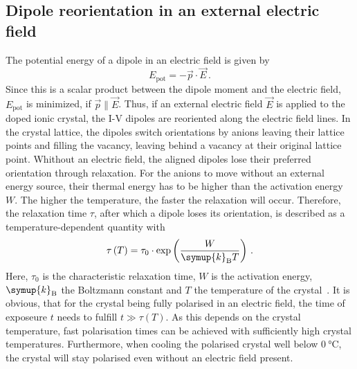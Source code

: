 \subsection{Dipole reorientation in an external electric field}
%
The potential energy of a dipole in an electric field is given by
\begin{equation*}
    E_{\mathrm{pot}} = -\vec{p}\cdot\vec{E}\,.
\end{equation*}
Since this is a scalar product between the dipole moment and the electric field, $E_{\mathrm{pot}}$ is minimized, if $\vec{p} \parallel \vec{E}$.
Thus, if an external electric field $\vec{E}$ is applied to the doped ionic crystal, the I-V dipoles are reoriented along the electric field lines.
In the crystal lattice, the dipoles switch orientations by anions leaving their lattice points and filling the vacancy, leaving behind a vacancy at their original lattice point.
\newline\noindent
Whithout an electric field, the aligned dipoles lose their preferred orientation through relaxation.
For the anions to move without an external energy source, their thermal energy has to be higher than the activation energy $W$.
The higher the temperature, the faster the relaxation will occur.
Therefore, the relaxation time $\tau$, after which a dipole loses its orientation, is described as a temperature-dependent quantity with
\begin{equation}
    \tau\left(T\right) = \tau_0\cdot\exp\left(\frac{W}{\symup{k}_{\mathrm{B}}T}\right)\,.
\label{eqn:tau}
\end{equation}
Here, $\tau_0$ is the characteristic relaxation time, $W$ is the activation energy, $\symup{k}_{\mathrm{B}}$ the Boltzmann constant and $T$ the temperature of the crystal~\cite[816]{Bucci_Fieschi}.
It is obvious, that for the crystal being fully polarised in an electric field, the time of exposeure $t$ needs to fulfill $t \gg \tau\left(T\right)$.
As this depends on the crystal temperature, fast polarisation times can be achieved with sufficiently high crystal temperatures.
Furthermore, when cooling the polarised crystal well below $\qty{0}{\degreeCelsius}$, the crystal will stay polarised even without an electric field present.
%
%
